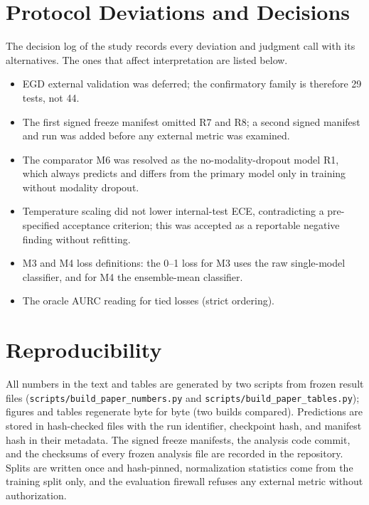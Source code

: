 \documentclass[journal]{IEEEtran}
\begin{document}
\begin{table}[!ht]
\centering
\caption{The $\numFamilySize$-Test Confirmatory Family: Estimate, 95\% Interval, Raw Permutation or DeLong $p$, and the Single Benjamini--Hochberg Adjusted $p$ at $q=0.05$}
\label{tab:family}
\footnotesize

\end{table}
\twocolumn

\clearpage
\section{Protocol Deviations and Decisions}
\label{app:deviations}
The decision log of the study records every deviation and judgment call with its alternatives. The ones that affect interpretation are listed below.
\begin{itemize}[leftmargin=1.2em]
\item EGD external validation was deferred; the confirmatory family is therefore 29 tests, not 44.
\item The first signed freeze manifest omitted R7 and R8; a second signed manifest and run was added before any external metric was examined.
\item The comparator M6 was resolved as the no-modality-dropout model R1, which always predicts and differs from the primary model only in training without modality dropout.
\item Temperature scaling did not lower internal-test ECE, contradicting a pre-specified acceptance criterion; this was accepted as a reportable negative finding without refitting.
\item M3 and M4 loss definitions: the 0--1 loss for M3 uses the raw single-model classifier, and for M4 the ensemble-mean classifier.
\item The oracle AURC reading for tied losses (strict ordering).
\end{itemize}

\section{Reproducibility}
\label{app:repro}
All numbers in the text and tables are generated by two scripts from frozen result files (\texttt{scripts/build\_paper\_numbers.py} and \texttt{scripts/build\_paper\_tables.py}); figures and tables regenerate byte for byte (two builds compared). Predictions are stored in hash-checked files with the run identifier, checkpoint hash, and manifest hash in their metadata. The signed freeze manifests, the analysis code commit, and the checksums of every frozen analysis file are recorded in the repository. Splits are written once and hash-pinned, normalization statistics come from the training split only, and the evaluation firewall refuses any external metric without authorization.
\end{document}
